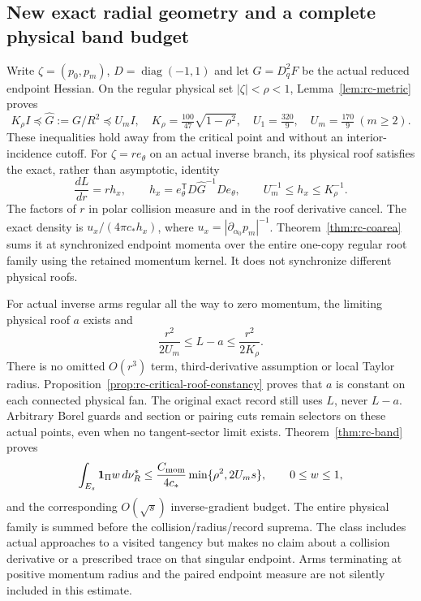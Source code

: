 \documentclass[11pt,reqno]{amsart}
\numberwithin{equation}{section}
\theoremstyle{definition}\newtheorem{definition}[theorem]{Definition}
\theoremstyle{remark}\newtheorem{remark}[theorem]{Remark}
\newcommand{\one}{\mathbf1}\newcommand{\dd}{\,\mathrm d}
\begin{document}
\subsection*{New exact radial geometry and a complete physical band budget}
Write $\zeta=(p_0,p_m)$, $D=\operatorname{diag}(-1,1)$ and let
$G=D_q^2F$ be the actual reduced endpoint Hessian. On the regular
physical set $|\zeta|<\rho<1$, Lemma~\ref{lem:rc-metric} proves
\[
 K_\rho I\preceq\widehat G:=G/R^2\preceq U_m I,
 \quad K_\rho=\tfrac{100}{47}\sqrt{1-\rho^2},\quad
 U_1=\tfrac{320}{9},\quad U_m=\tfrac{170}{9}\ (m\ge2).
\]
These inequalities hold away from the critical point and without an
interior-incidence cutoff. For $\zeta=re_\theta$ on an actual inverse
branch, its physical roof satisfies the exact, rather than asymptotic,
identity
\[
 \frac{dL}{dr}=r h_x,\qquad
 h_x=e_\theta^{\mathsf T}D\widehat G^{-1}De_\theta,
 \qquad U_m^{-1}\le h_x\le K_\rho^{-1}.
\]
The factors of $r$ in polar collision measure and in the roof derivative
cancel. The exact density is
$u_x/(4\pi c_*h_x)$, where
$u_x=|\partial_{\alpha_0}p_m|^{-1}$.
Theorem~\ref{thm:rc-coarea} sums it at synchronized endpoint momenta
over the entire one-copy regular root family using the retained momentum
kernel. It does not synchronize different physical roofs.

For actual inverse arms regular all the way to zero momentum, the
limiting physical roof $a$ exists and
\[
 \frac{r^2}{2U_m}\le L-a\le\frac{r^2}{2K_\rho}.
\]
There is no omitted $O(r^3)$ term, third-derivative assumption or local
Taylor radius. Proposition~\ref{prop:rc-critical-roof-constancy} proves
that $a$ is constant on each connected physical fan. The original exact
record still uses $L$, never $L-a$. Arbitrary Borel guards and section
or pairing cuts remain selectors on these actual points, even when
no tangent-sector limit exists. Theorem~\ref{thm:rc-band} proves
\[
 \int_{E_s}\one_\Pi w\,d\nu_R^*
 \le\frac{C_{\rm mom}}{4c_*}\min\{\rho^2,2U_m s\},
 \qquad 0\le w\le1,
\]
and the corresponding $O(\sqrt{s})$ inverse-gradient budget. The entire
physical family is summed before the collision/radius/record suprema.
The class includes actual approaches to a visited tangency but makes no
claim about a collision derivative or a prescribed trace on that
singular endpoint. Arms terminating at positive momentum radius and the
paired endpoint measure are not silently included in this estimate.
\end{document}
